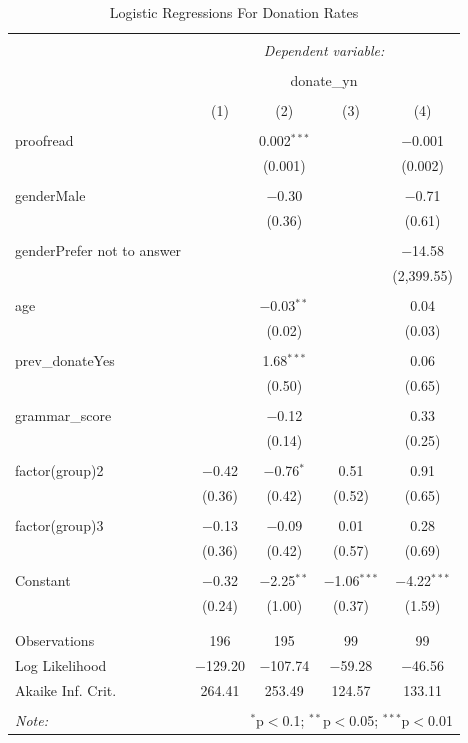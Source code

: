 \documentclass[]{article}
\begin{document}
\begin{table}[!htbp] \centering 
  \caption{Logistic Regressions For Donation Rates} 
  \label{} 
\begin{tabular}{@{\extracolsep{5pt}}lcccc} 
\\[-1.8ex]\hline 
\hline \\[-1.8ex] 
 & \multicolumn{4}{c}{\textit{Dependent variable:}} \\ 
\cline{2-5} 
\\[-1.8ex] & \multicolumn{4}{c}{donate\_yn} \\ 
\\[-1.8ex] & (1) & (2) & (3) & (4)\\ 
\hline \\[-1.8ex] 
 proofread &  & 0.002$^{***}$ &  & $-$0.001 \\ 
  &  & (0.001) &  & (0.002) \\ 
  & & & & \\ 
 genderMale &  & $-$0.30 &  & $-$0.71 \\ 
  &  & (0.36) &  & (0.61) \\ 
  & & & & \\ 
 genderPrefer not to answer &  &  &  & $-$14.58 \\ 
  &  &  &  & (2,399.55) \\ 
  & & & & \\ 
 age &  & $-$0.03$^{**}$ &  & 0.04 \\ 
  &  & (0.02) &  & (0.03) \\ 
  & & & & \\ 
 prev\_donateYes &  & 1.68$^{***}$ &  & 0.06 \\ 
  &  & (0.50) &  & (0.65) \\ 
  & & & & \\ 
 grammar\_score &  & $-$0.12 &  & 0.33 \\ 
  &  & (0.14) &  & (0.25) \\ 
  & & & & \\ 
 factor(group)2 & $-$0.42 & $-$0.76$^{*}$ & 0.51 & 0.91 \\ 
  & (0.36) & (0.42) & (0.52) & (0.65) \\ 
  & & & & \\ 
 factor(group)3 & $-$0.13 & $-$0.09 & 0.01 & 0.28 \\ 
  & (0.36) & (0.42) & (0.57) & (0.69) \\ 
  & & & & \\ 
 Constant & $-$0.32 & $-$2.25$^{**}$ & $-$1.06$^{***}$ & $-$4.22$^{***}$ \\ 
  & (0.24) & (1.00) & (0.37) & (1.59) \\ 
  & & & & \\ 
\hline \\[-1.8ex] 
Observations & 196 & 195 & 99 & 99 \\ 
Log Likelihood & $-$129.20 & $-$107.74 & $-$59.28 & $-$46.56 \\ 
Akaike Inf. Crit. & 264.41 & 253.49 & 124.57 & 133.11 \\ 
\hline 
\hline \\[-1.8ex] 
\textit{Note:}  & \multicolumn{4}{r}{$^{*}$p$<$0.1; $^{**}$p$<$0.05; $^{***}$p$<$0.01} \\ 
\end{tabular} 
\end{table}
\end{document}
